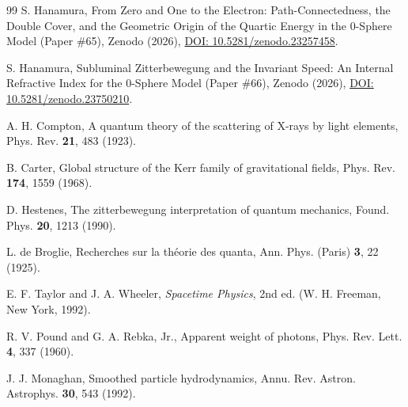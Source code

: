 \documentclass[%
 reprint, amsmath,amssymb, aps, prb, ]{revtex4-2}
\numberwithin{equation}{section}
\begin{document}
\begin{thebibliography}{99}
 S. Hanamura, From Zero and One to the Electron: Path-Connectedness, the Double Cover, and the Geometric Origin of the Quartic Energy in the 0-Sphere Model (Paper \#65), Zenodo (2026), \href{https://doi.org/10.5281/zenodo.23257458}{DOI: 10.5281/zenodo.23257458}.

 S. Hanamura, Subluminal Zitterbewegung and the Invariant Speed: An Internal Refractive Index for the 0-Sphere Model (Paper \#66), Zenodo (2026), \href{https://doi.org/10.5281/zenodo.23750210}{DOI: 10.5281/zenodo.23750210}.

 A. H. Compton, A quantum theory of the scattering of X-rays by light elements, Phys. Rev. \textbf{21}, 483 (1923).

 B. Carter, Global structure of the Kerr family of gravitational fields, Phys. Rev. \textbf{174}, 1559 (1968).

 D. Hestenes, The zitterbewegung interpretation of quantum mechanics, Found. Phys. \textbf{20}, 1213 (1990).

 L. de Broglie, Recherches sur la th\'eorie des quanta, Ann. Phys. (Paris) \textbf{3}, 22 (1925).

 E. F. Taylor and J. A. Wheeler, \emph{Spacetime Physics}, 2nd ed. (W. H. Freeman, New York, 1992).

 R. V. Pound and G. A. Rebka, Jr., Apparent weight of photons, Phys. Rev. Lett. \textbf{4}, 337 (1960).

 J. J. Monaghan, Smoothed particle hydrodynamics, Annu. Rev. Astron. Astrophys. \textbf{30}, 543 (1992).

\end{thebibliography}
\end{document}
